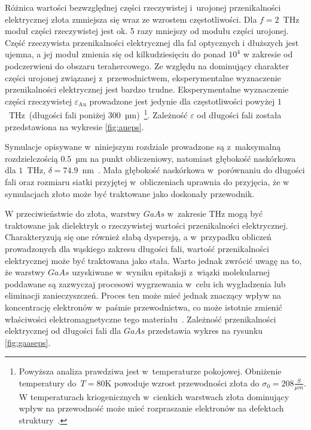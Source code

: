 Różnica wartości bezwzględnej części rzeczywistej i~urojonej przenikalności elektrycznej złota zmniejsza się wraz ze wzrostem częstotliwości. Dla $f=2$~THz moduł części rzeczywistej jest ok. 5 razy mniejszy od modułu części urojonej. Część rzeczywista przenikalności elektrycznej dla fal optycznych i dłuższych jest ujemna, a jej moduł zmienia się od kilkudziesięciu do ponad $10^4$ w zakresie od podczerwieni do obszaru terahercowego. Ze względu na dominujący charakter części urojonej związanej z~przewodnictwem, eksperymentalne wyznaczenie przenikalności elektrycznej jest bardzo trudne. Eksperymentalne wyznaczenie części rzeczywistej $\varepsilon_{\textrm{Au}}$ prowadzone jest jedynie dla częstotliwości powyżej $1$~THz~(długości fali poniżej  $300$~µm)~\cite{ordal1983optical}\footnote{Powyższa analiza prawdziwa jest w~temperaturze pokojowej. Obniżenie temperatury do~$T=$80K powoduje wzrost przewodności złota do $\sigma_0=208\frac{S}{\mu m}$. W temperaturach kriogenicznych w~cienkich warstwach złota dominujący wpływ na przewodność może mieć rozpraszanie elektronów na defektach struktury~\cite{lide2009crc}.}. Zależność $\varepsilon$ od długości fali została przedstawiona na wykresie \ref{fig:aueps}. 

Symulacje opisywane w~niniejszym rozdziale prowadzone są z~maksymalną rozdzielczością $0.5$~µm na punkt obliczeniowy, natomiast głębokość naskórkowa dla $1$~THz, $\delta=74.9$~nm~\cite{lee2009principles}. Mała głębokość naskórkowa w~porównaniu do długości fali oraz rozmiaru siatki przyjętej w~obliczeniach uprawnia do przyjęcia, że w symulacjach złoto może być traktowane jako doskonały przewodnik. 

W przeciwieństwie do złota, warstwy $GaAs$ w~zakresie THz mogą być traktowane jak dielektryk o rzeczywistej wartości przenikalności elektrycznej. Charakteryzują się one również słabą dyspersją, a w~przypadku obliczeń prowadzonych dla wąskiego zakresu długości fali, wartość przenikalności elektrycznej może być traktowana jako stała. Warto jednak zwrócić uwagę na to, że warstwy $GaAs$ uzyskiwane w~wyniku epitaksji z~wiązki molekularnej poddawane są zazwyczaj procesowi wygrzewania w~celu ich wygładzenia lub eliminacji zanieczyszczeń. Proces ten może mieć jednak znaczący wpływ na koncentrację elektronów w~paśmie przewodnictwa, co może istotnie zmienić właściwości elektromagnetyczne tego materiału~\cite{zhang2009annealing}. Zależność przenikalności elektrycznej od długości fali dla $GaAs$ przedstawia wykres na rysunku \ref{fig:gaaseps}.
